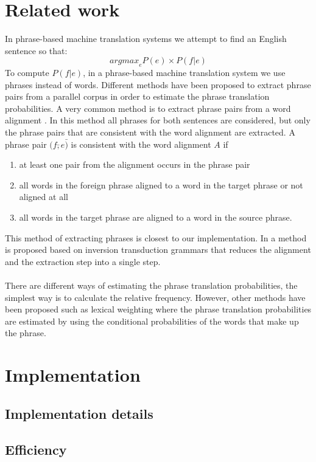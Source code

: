 \documentclass[11pt]{article}
\begin{document}
\section{Related work}
In phrase-based machine translation systems we attempt to find an English sentence so that: 
$$\textit{argmax}_e P(e) \times P(f|e)$$
To compute $P(f|e)$, in a phrase-based machine translation system we use phrases instead of words. Different methods have been proposed to extract phrase pairs from a parallel corpus in order to estimate the phrase translation probabilities. A very common method is to extract phrase pairs from a word alignment \cite{koehn}\cite{theother}. In this method all phrases for both sentences are considered, but only the phrase pairs that are consistent with the word alignment are extracted. A phrase pair $(f\bar, e\bar)$ is consistent with the word alignment $A$ if
\begin{enumerate}
\item at least one pair from the alignment occurs in the phrase pair
\item all words in the foreign phrase aligned to a word in the target phrase or not aligned at all
\item all words in the target phrase are aligned to a word in the source phrase.
\end{enumerate} 
This method of extracting phrases is closest to our implementation. In \cite{super} a method is proposed based on inversion transduction grammars that reduces the alignment and the extraction step into a single step. \\\\
There are different ways of estimating the phrase translation probabilities, the simplest way is to calculate the relative frequency. However, other methods have been proposed such as lexical weighting \cite{lexical} where the phrase translation probabilities are estimated by using the conditional probabilities of the words that make up the phrase.

\section{Implementation}
\label{implem}

\subsection{Implementation details}

\subsection{Efficiency}
\end{document}
